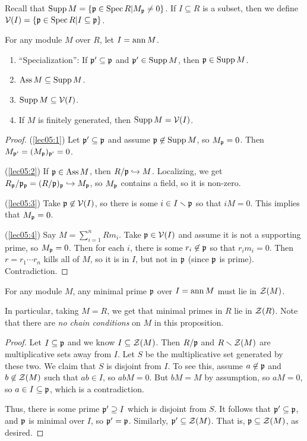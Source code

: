  Recall that $\operatorname{Supp} M = \{\mathfrak{p}\in \operatorname{Spec} R| M_{\mathfrak{p}}\neq 0\}$. If $I\subseteq R$ is a subset, then we
 define $\mathcal{V}(I) = \{\mathfrak{p}\in \operatorname{Spec} R|I\subseteq \mathfrak{p} \}$.
 \begin{proposition}
   For any module $M$ over $R$, let $I=\operatorname{ann} M$.
   \begin{enumerate}
     \item \label{lec05:1} ``Specialization'': If $\mathfrak{p}'\subseteq\mathfrak{p}$ and $\mathfrak{p}'\in\operatorname{Supp} M$, then $\mathfrak{p}\in \operatorname{Supp}
     M$.
     \item \label{lec05:2} $\operatorname{Ass} M \subseteq \operatorname{Supp} M$.
     \item \label{lec05:3} $\operatorname{Supp} M \subseteq \mathcal{V}(I)$.
     \item \label{lec05:4} If $M$ is finitely generated, then $\operatorname{Supp} M=\mathcal{V}(I)$.
   \end{enumerate}
 \end{proposition}
 \begin{proof}
   (\ref{lec05:1}) Let $\mathfrak{p}'\subseteq \mathfrak{p}$ and assume $\mathfrak{p}\not\in \operatorname{Supp} M$, so $M_{\mathfrak{p}}=0$. Then
   $M_{\mathfrak{p}'}=(M_{\mathfrak{p}})_{\mathfrak{p}'} = 0$.

   (\ref{lec05:2}) If $\mathfrak{p}\in \operatorname{Ass} M$, then $R/\mathfrak{p}\hookrightarrow M$.
   Localizing, we get $R_{\mathfrak{p}}/\mathfrak{p}_{\mathfrak{p}} = (R/\mathfrak{p})_{\mathfrak{p}}\hookrightarrow M_{\mathfrak{p}}$, so $M_{\mathfrak{p}}$ contains a
   field, so it is non-zero.

   (\ref{lec05:3}) Take $\mathfrak{p}\not\in \mathcal{V}(I)$, so there is some $i\in
   I\smallsetminus \mathfrak{p}$ so that $iM=0$. This implies that $M_{\mathfrak{p}}=0$.

   (\ref{lec05:4}) Say $M = \sum_{i=1}^n Rm_i$. Take $\mathfrak{p}\in\mathcal{V}(I)$ and assume it is not a
   supporting prime, so $M_{\mathfrak{p}}=0$. Then for each $i$, there is some $r_i\not\in \mathfrak{p}$ so
   that $r_im_i=0$. Then $r=r_1\cdots r_n$ kills all of $M$, so it is in $I$, but
   not in $\mathfrak{p}$ (since $\mathfrak{p}$ is prime). Contradiction.
 \end{proof}
 \begin{proposition}
   For any module $M$, any minimal prime $\mathfrak{p}$ over $I=\operatorname{ann} M$ must lie in $\mathcal{Z}(M)$.
 \end{proposition}
 In particular, taking $M=R$, we get that minimal primes in $R$ lie in $\mathcal{Z}(R)$. Note that
 there are \emph{no chain conditions} on $M$ in this proposition.
 \begin{proof}
   Let $I\subseteq \mathfrak{p}$ and we know $I\subseteq \mathcal{Z}(M)$. Then $R/\mathfrak{p}$ and $R\smallsetminus
   \mathcal{Z}(M)$ are multiplicative sets away from $I$. Let $S$ be the multiplicative set
   generated by these two. We claim that $S$ is disjoint from $I$. To see this, assume
   $a\not\in \mathfrak{p}$ and $b\not\in \mathcal{Z}(M)$ such that $ab\in I$, so $abM=0$. But $bM=M$ by
   assumption, so $aM=0$, so $a\in I\subseteq \mathfrak{p}$, which is a contradiction.

   Thus, there is some prime $\mathfrak{p}'\supseteq I$ which is disjoint from $S$. It follows that
   $\mathfrak{p}'\subseteq \mathfrak{p}$, and $\mathfrak{p}$ is minimal over $I$, so $\mathfrak{p}'=\mathfrak{p}$. Similarly, $\mathfrak{p}'\subseteq
   \mathcal{Z}(M)$. That is, $\mathfrak{p}\subseteq \mathcal{Z}(M)$, as desired.
 \end{proof}

